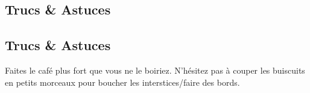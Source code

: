     \vspace{1cm}
    \hline
    \vspace{1cm}
    
    \subsection{Trucs \& Astuces}
        \subsection{Trucs \& Astuces}
	Faites le café plus fort que vous ne le boiriez. N'hésitez pas à couper les buiscuits en petits morceaux pour boucher les interstices/faire des bords.
